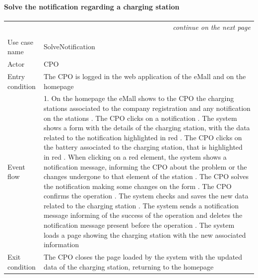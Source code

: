 \paragraph{Solve the notification regarding a charging station}
\begin{center}
    \begin{longtable}{p{4cm} p{11cm}}
    \multicolumn{2}{r}{\itshape{continue on the next page}}\\
    \endfoot 
    \\
    \endlastfoot
    \hline
     Use case name &  SolveNotification\\
     \hline
     Actor & CPO \\
     \hline
     Entry condition & The CPO is logged in the web application of the eMall and on the homepage \\
     \hline
     Event flow &   1. On the homepage the eMall shows to the CPO the charging stations associated to the company                   registration and any notification on the stations \newline
                    2. The CPO clicks on a notification \newline 
                    3. The system shows a form with the details of the charging station, with the data related to the notification highlighted in red  \newline
                    4. The CPO clicks on the battery associated to the charging station, that is highlighted in red \newline
                    5. When clicking on a red element, the system shows a notification message, informing the CPO about the problem or the changes undergone to that element of the station \newline
                    6. The CPO solves the notification making some changes on the form \newline
                    7. The CPO confirms the operation \newline
                    8. The system checks and saves the new data related to the charging station \newline
                    9. The system sends a notification message informing of the success of the operation and deletes the notification message present before the operation \newline
                    10. The system loads a page showing the charging station with the new associated information\\
     \hline
     Exit condition &  The CPO closes the page loaded by the system with the updated data of the charging station, returning to the homepage \\

\end{longtable}
\end{center}
